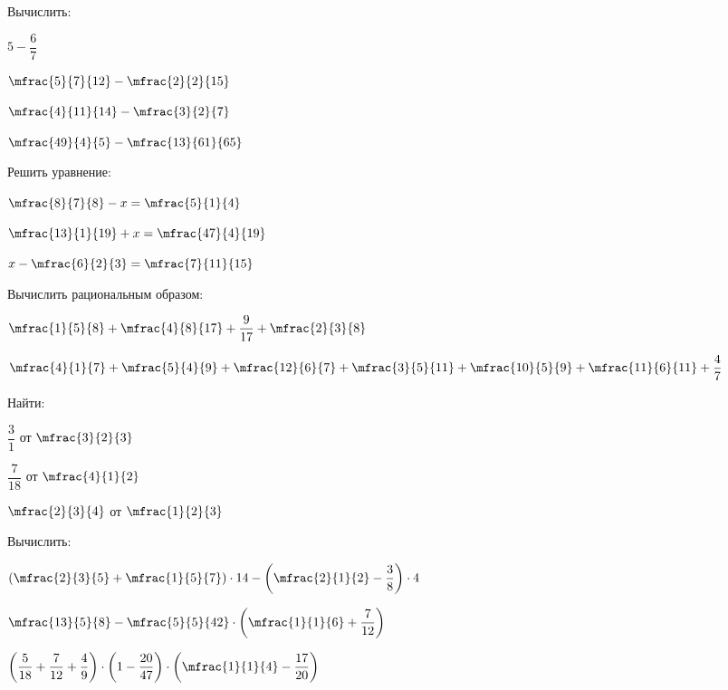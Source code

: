 \begin{class}[number=4]
	\begin{listofex}
		\item Вычислить:
		\begin{enumcols}[itemcolumns=4]
			\item \( 5-\dfrac{6}{7} \)
			\item \( \mfrac{5}{7}{12}-\mfrac{2}{2}{15} \)
			\item \( \mfrac{4}{11}{14}-\mfrac{3}{2}{7} \)
			\item \( \mfrac{49}{4}{5}-\mfrac{13}{61}{65} \)
		\end{enumcols}
		\item Решить уравнение:
		\begin{enumcols}[itemcolumns=3]
			\item \( \mfrac{8}{7}{8}-x=\mfrac{5}{1}{4} \)
			\item \( \mfrac{13}{1}{19}+x=\mfrac{47}{4}{19} \)
			\item \( x-\mfrac{6}{2}{3}=\mfrac{7}{11}{15} \)
		\end{enumcols}
		\item Вычислить рациональным образом:
		\begin{enumcols}[itemcolumns=2]
			\item \( \mfrac{1}{5}{8}+\mfrac{4}{8}{17}+\dfrac{9}{17}+\mfrac{2}{3}{8} \)
			\item \( \mfrac{4}{1}{7}+\mfrac{5}{4}{9}+\mfrac{12}{6}{7}+\mfrac{3}{5}{11}+\mfrac{10}{5}{9}+\mfrac{11}{6}{11}+\dfrac{4}{7} \)
		\end{enumcols}
		\item Найти:
		\begin{enumcols}[itemcolumns=3]
			\item \( \dfrac{3}{1} \) от \( \mfrac{3}{2}{3} \)
			\item \( \dfrac{7}{18} \) от \( \mfrac{4}{1}{2} \)
			\item \( \mfrac{2}{3}{4} \) от \( \mfrac{1}{2}{3} \)
		\end{enumcols}
		\item Вычислить: %
		\begin{enumcols}[itemcolumns=1]
			\item \( \left( \mfrac{2}{3}{5}+\mfrac{1}{5}{7} \right)\cdot14-\left( \mfrac{2}{1}{2}-\dfrac{3}{8} \right)\cdot4 \)
			\item \( \mfrac{13}{5}{8}-\mfrac{5}{5}{42}\cdot\left( \mfrac{1}{1}{6}+\dfrac{7}{12} \right) \)
			\item \( \left( \dfrac{5}{18}+\dfrac{7}{12}+\dfrac{4}{9} \right)\cdot\left( 1-\dfrac{20}{47} \right)\cdot\left( \mfrac{1}{1}{4}-\dfrac{17}{20} \right) \)

\end{enumcols}
\end{listofex}
\end{class}
